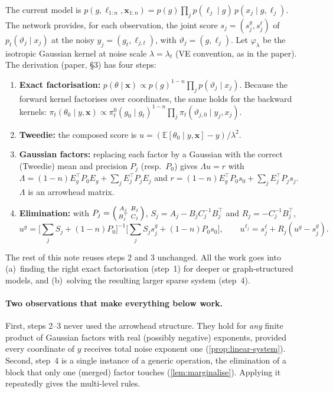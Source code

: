 \documentclass[11pt]{article}
\theoremstyle{definition}
\theoremstyle{remark}
\newcommand{\E}{\mathbb{E}}
\newcommand{\T}{\top}
\newcommand{\lam}{\lambda}
\newcommand{\X}{\mathbf{x}}
\begin{document}
The current model is
$p(g,\ell_{1:n},\X_{1:n})=p(g)\prod_{j}p(\ell_j\mid g)\,p(x_j\mid g,\ell_j)$.
The network provides, for each observation, the joint score
$s_j=(s_j^g,s_j^\ell)$ of $p_t(\vartheta_j\mid x_j)$ at the noisy
$y_j=(g_t,\ell_{j,t})$, with $\vartheta_j=(g,\ell_j)$. Let $\varphi_\lam$ be the
isotropic Gaussian kernel at noise scale $\lam=\lam_t$ (VE convention, as in the
paper). The derivation (paper, \S3) has four steps:
\begin{enumerate}
\item \textbf{Exact factorisation:}
 $p(\theta\mid\X)\propto p(g)^{1-n}\prod_jp(\vartheta_j\mid x_j)$. Because the
 forward kernel factorises over coordinates, the same holds for the backward
 kernels:
 $\pi_t(\theta_0\mid y,\X)\propto\pi_t^0(g_0\mid g_t)^{1-n}\prod_j\pi_t(\vartheta_{j,0}\mid y_j,x_j)$.
\item \textbf{Tweedie:} the composed score is $u=(\E[\theta_0\mid y,\X]-y)/\lam^2$.
\item \textbf{Gaussian factors:} replacing each factor by a Gaussian with the
 correct (Tweedie) mean and precision $P_j$ (resp.\ $P_0$) gives $\Lambda u=r$
 with
 $\Lambda=(1-n)E_g^\T P_0E_g+\sum_jE_j^\T P_jE_j$ and
 $r=(1-n)E_g^\T P_0s_0+\sum_jE_j^\T P_js_j$. $\Lambda$ is an arrowhead matrix.
\item \textbf{Elimination:} with $P_j=\begin{psmallmatrix}A_j&B_j\\B_j^\T&C_j\end{psmallmatrix}$,
 $S_j=A_j-B_jC_j^{-1}B_j^\T$ and $R_j=-C_j^{-1}B_j^\T$,
 \begin{equation}\label{eq:two-level}
 u^g=\Big[\sum_jS_j+(1-n)P_0\Big]^{-1}\Big[\sum_jS_js_j^g+(1-n)P_0s_0\Big],\qquad
 u^{\ell_j}=s_j^\ell+R_j(u^g-s_j^g).
 \end{equation}
\end{enumerate}
The rest of this note reuses steps 2 and 3 unchanged. All the work goes into
(a)~finding the right exact factorisation (step~1) for deeper or graph-structured
models, and (b)~solving the resulting larger sparse system (step~4).

\paragraph{Two observations that make everything below work.}
First, steps 2--3 never used the arrowhead structure. They hold for \emph{any}
finite product of Gaussian factors with real (possibly negative) exponents,
provided every coordinate of $y$ receives total noise exponent one (\cref{prop:linear-system}).
Second, step~4 is a single instance of a generic operation, the elimination of a
block that only one (merged) factor touches (\cref{lem:marginalise}). Applying it
repeatedly gives the multi-level rules.
\end{document}
